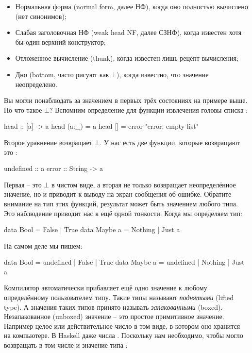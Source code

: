 \begin{itemize}
\item Нормальная форма (normal form, далее НФ),
    когда оно полностью вычислено (нет синонимов);

\item Слабая заголовочная НФ (weak head NF, далее СЗНФ), 
    когда известен хотя бы один верхний конструктор;

\item Отложенное вычисление (thunk), 
    когда известен лишь рецепт вычисления;

\item Дно (bottom, часто рисуют как $\bot$), 
    когда известно, что значение неопределено.
\end{itemize}


Вы могли понаблюдать за значением в первых трёх состояниях
на примере выше. Но что такое $\bot$? Вспомним определение
для функции извлечения головы списка :

\begin{code}
head :: [a] -> a
head (a:_)  = a
head []     = error "error: empty list" 
\end{code}

Второе уравнение возвращает $\bot$. У нас есть две функции,
которые возвращают это :

\begin{code}
undefined   :: a
error       :: String -> a
\end{code}

Первая -- это $\bot$ в чистом виде, а вторая не только возвращает
неопределённое значение, но и приводит к выводу на экран 
сообщения об ошибке. Обратите внимание на тип этих функций,
результат может быть значением любого типа. Это наблюдение
приводит нас к ещё одной тонкости. Когда мы определяем тип:

\begin{code}
data Bool       = False | True
data Maybe a    = Nothing | Just a
\end{code}

На самом деле мы пишем:

\begin{code}
data Bool       = undefined | False | True
data Maybe a    = undefined | Nothing | Just a
\end{code}

Компилятор автоматически прибавляет ещё одно значение
к любому определённому пользователем типу. Такие
типы называют \emph{поднятыми} (lifted type). А значения
таких типов принято называть \emph{запакованными} (boxed).
Незапакованное (unboxed) значение -- это простое примитивное значение.
Например целое или действительное число в том виде, в котором
оно хранится на компьютере. В Haskell даже числа .
Поскольку нам необходимо, чтобы  могло возвращать
в том числе и значение типа :

